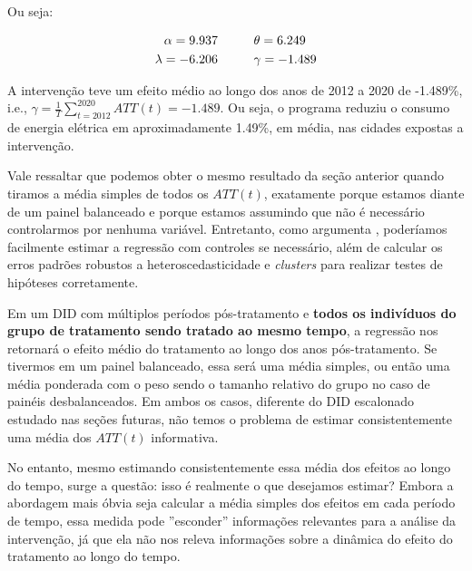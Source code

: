 \documentclass[portugues]{article}
\begin{document}
\begin{boxA}
   Ou seja:

\[\begin{split}
    \alpha = 9.937 & \hspace{10mm} \theta = 6.249 \\
    \lambda = -6.206 &  \hspace{10mm} \gamma = -1.489
\end{split}\]

A intervenção teve um efeito médio ao longo dos anos de 2012 a 2020 de -1.489\%, i.e., $\gamma = \frac{1}{T} \sum_{t=2012}^{2020} ATT(t)= -1.489$. Ou seja, o programa reduziu o consumo de energia elétrica em aproximadamente 1.49\%, em média, nas cidades expostas a intervenção.

Vale ressaltar que podemos obter o mesmo resultado da seção anterior quando tiramos a média simples de todos os $ATT(t)$, exatamente porque estamos diante de um painel balanceado e porque estamos assumindo que não é necessário controlarmos por nenhuma variável. Entretanto, como argumenta \cite{angrist2009mostly}, poderíamos facilmente estimar a regressão com controles se necessário, além de calcular os erros padrões robustos a heteroscedasticidade e \textit{clusters} para realizar testes de hipóteses corretamente.
    
\end{boxA}

Em um DID com múltiplos períodos pós-tratamento e \textbf{todos os indivíduos do grupo de tratamento sendo tratado ao mesmo tempo}, a regressão nos retornará o efeito médio do tratamento ao longo dos anos pós-tratamento. Se tivermos em um painel balanceado, essa será uma média simples, ou então uma média ponderada com o peso sendo o tamanho relativo do grupo no caso de painéis desbalanceados. Em ambos os casos, diferente do DID escalonado estudado nas seções futuras, não temos o problema de estimar consistentemente uma média dos $ATT(t)$ informativa.   

No entanto, mesmo estimando consistentemente essa média dos efeitos ao longo do tempo, surge a questão: isso é realmente o que desejamos estimar? Embora a abordagem mais óbvia seja calcular a média simples dos efeitos em cada período de tempo, essa medida pode ''esconder'' informações relevantes para a análise da intervenção, já que ela não nos releva informações sobre a dinâmica do efeito do tratamento ao longo do tempo. 
\end{document}
